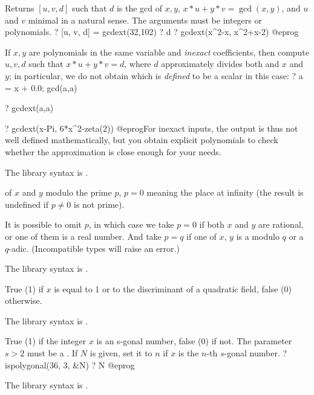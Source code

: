\label{se:gcdext}
Returns $[u,v,d]$ such that $d$ is the gcd of $x,y$,
$x*u+y*v=\gcd(x,y)$, and $u$ and $v$ minimal in a natural sense.
The arguments must be integers or polynomials. 
\bprog
? [u, v, d] = gcdext(32,102)
? d
? gcdext(x^2-x, x^2+x-2)
@eprog

If $x,y$ are polynomials in the same variable and \emph{inexact}
coefficients, then compute $u,v,d$ such that $x*u+y*v = d$, where $d$
approximately divides both and $x$ and $y$; in particular, we do not obtain
 which is \emph{defined} to be a scalar in this case:
\bprog
? a = x + 0.0; gcd(a,a)

? gcdext(a,a)

? gcdext(x-Pi, 6*x^2-zeta(2))
@eprog\noindent For inexact inputs, the output is thus not well defined
mathematically, but you obtain explicit polynomials to check whether the
approximation is close enough for your needs.

The library syntax is .

\label{se:hilbert}
 of $x$ and $y$ modulo the prime $p$, $p=0$ meaning
the place at infinity (the result is undefined if $p\neq 0$ is not prime).

It is possible to omit $p$, in which case we take $p = 0$ if both $x$
and $y$ are rational, or one of them is a real number. And take $p = q$
if one of $x$, $y$ is a  modulo $q$ or a $q$-adic. (Incompatible
types will raise an error.)

The library syntax is .

\label{se:isfundamental}
True (1) if $x$ is equal to 1 or to the discriminant of a quadratic
field, false (0) otherwise.

The library syntax is .

\label{se:ispolygonal}
True (1) if the integer $x$ is an s-gonal number, false (0) if not.
The parameter $s > 2$ must be a . If $N$ is given, set it to $n$
if $x$ is the $n$-th $s$-gonal number.
\bprog
? ispolygonal(36, 3, &N)
? N
@eprog

The library syntax is .

